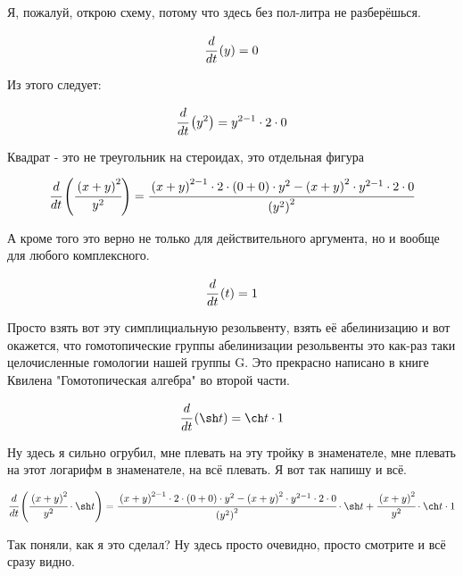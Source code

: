 Я, пожалуй, открою схему, потому что здесь без пол-литра не разберёшься.


\begin{dmath}
 \cfrac{d}{d t} \left( y \right) = 0 
\end{dmath}


Из этого следует:


\begin{dmath}
 \cfrac{d}{d t} \left( y^{2} \right) = y^{2 - 1} \cdot 2 \cdot 0 
\end{dmath}


Квадрат - это не треугольник на стероидах, это отдельная фигура


\begin{dmath}
 \cfrac{d}{d t} \left( \cfrac{\left(x + y\right)^{2}}{y^{2}} \right) = \cfrac{\left(x + y\right)^{2 - 1} \cdot 2 \cdot \left(0 + 0\right) \cdot y^{2} - \left(x + y\right)^{2} \cdot y^{2 - 1} \cdot 2 \cdot 0}{\left(y^{2}\right)^{2}} 
\end{dmath}


А кроме того это верно не только для действительного аргумента, но и вообще для любого комплексного.


\begin{dmath}
 \cfrac{d}{d t} \left( t \right) = 1 
\end{dmath}


Просто взять вот эту симплициальную резольвенту, взять её абелинизацию и вот окажется, что гомотопические группы абелинизации резольвенты это как-раз таки целочисленные гомологии нашей группы G. Это прекрасно написано в книге Квилена "Гомотопическая алгебра" во второй части.


\begin{dmath}
 \cfrac{d}{d t} \left( \sh t \right) = \ch t \cdot 1 
\end{dmath}


Ну здесь я сильно огрубил, мне плевать на эту тройку в знаменателе, мне плевать на этот логарифм в знаменателе, на всё плевать. Я вот так напишу и всё.


\begin{dmath}
 \cfrac{d}{d t} \left( \cfrac{\left(x + y\right)^{2}}{y^{2}} \cdot \sh t \right) = \cfrac{\left(x + y\right)^{2 - 1} \cdot 2 \cdot \left(0 + 0\right) \cdot y^{2} - \left(x + y\right)^{2} \cdot y^{2 - 1} \cdot 2 \cdot 0}{\left(y^{2}\right)^{2}} \cdot \sh t + \cfrac{\left(x + y\right)^{2}}{y^{2}} \cdot \ch t \cdot 1 
\end{dmath}


Так поняли, как я это сделал? Ну здесь просто очевидно, просто смотрите и всё сразу видно.


